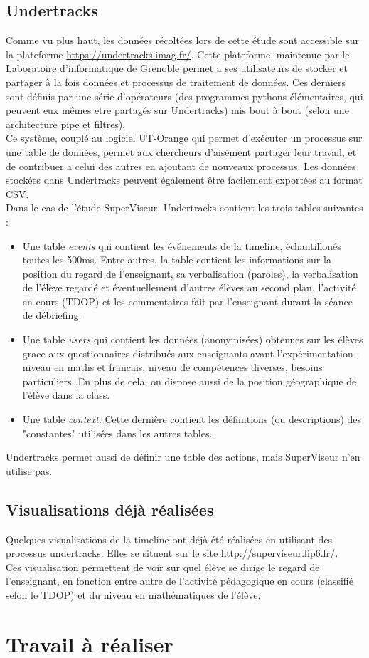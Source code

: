 \documentclass{article}
\begin{document}
\subsection{Undertracks}
Comme vu plus haut, les données récoltées lors de cette étude sont accessible sur la plateforme \href{https://undertracks.imag.fr/}{https://undertracks.imag.fr/}.
Cette plateforme, maintenue par le Laboratoire d'informatique de Grenoble permet a ses utilisateurs de stocker et partager à la fois données et processus de traitement de données. Ces derniers sont définis par une série d'opérateurs (des programmes pythons élémentaires, qui peuvent eux mêmes etre partagés sur Undertracks) mis bout à bout (selon une architecture pipe et filtres).\\
Ce système, couplé au logiciel UT-Orange qui permet d'exécuter un processus sur une table de données, permet aux chercheurs d'aisément partager leur travail, et de contribuer a celui des autres en ajoutant de nouveaux processus. Les données stockées dans Undertracks peuvent également être facilement exportées au format CSV.\\
Dans le cas de l'étude SuperViseur, Undertracks contient les trois tables suivantes :
\begin{itemize}
  \item Une table \textit{events} qui contient les événements de la timeline, échantillonés toutes les 500ms. Entre autres, la table contient les informations sur la position du regard de l'enseignant, sa verbalisation (paroles), la verbalisation de l'élève regardé et éventuellement d'autres élèves au second plan, l'activité en cours (TDOP) et les commentaires fait par l'enseignant durant la séance de débriefing.
  \item Une table \textit{users} qui contient les données (anonymisées) obtenues sur les élèves grace aux questionnaires distribués aux enseignants avant l'expérimentation : niveau en maths et francais, niveau de compétences diverses, besoins particuliers\ldots En plus de cela, on dispose aussi de la position géographique de l'élève dans la class.
  \item Une table \textit{context}. Cette dernière contient les définitions (ou descriptions) des "constantes" utilisées dans les autres tables.
\end{itemize}
Undertracks permet aussi de définir une table des actions, mais SuperViseur n'en utilise pas.

\subsection{Visualisations déjà réalisées}
Quelques visualisations de la timeline ont déjà été réalisées en utilisant des processus undertracks. Elles se situent sur le site \href{http://superviseur.lip6.fr/}{http://superviseur.lip6.fr/}.\\
Ces visualisation permettent de voir sur quel élève se dirige le regard de l'enseignant, en fonction entre autre de l'activité pédagogique en cours (classifié selon le TDOP) et du niveau en mathématiques de l'élève.

\section{Travail à réaliser}

{}

\end{document}

